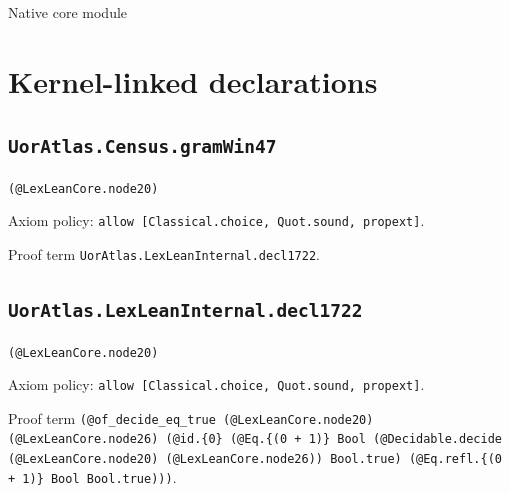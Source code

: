\documentclass[11pt]{article}
\begin{document}
\begin{center}{\LARGE Native core module}\end{center}
\section*{Kernel-linked declarations}
\subsection*{\texttt{UorAtlas.Census.gramWin47}}
\noindent\texttt{(@LexLeanCore.node20)}\par
\noindent Axiom policy: \texttt{allow [Classical.choice, Quot.sound, propext]}.\par
\noindent Proof term \texttt{UorAtlas.LexLeanInternal.decl1722}.\par
\subsection*{\texttt{UorAtlas.LexLeanInternal.decl1722}}
\noindent\texttt{(@LexLeanCore.node20)}\par
\noindent Axiom policy: \texttt{allow [Classical.choice, Quot.sound, propext]}.\par
\noindent Proof term \texttt{(@of\_decide\_eq\_true (@LexLeanCore.node20) (@LexLeanCore.node26) (@id.\{0\} (@Eq.\{(0 + 1)\} Bool (@Decidable.decide (@LexLeanCore.node20) (@LexLeanCore.node26)) Bool.true) (@Eq.refl.\{(0 + 1)\} Bool Bool.true)))}.\par
\end{document}
